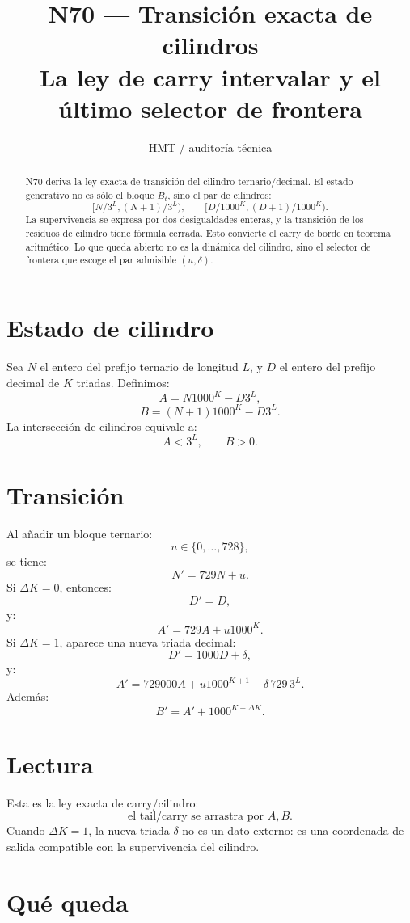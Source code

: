 \documentclass[11pt,a4paper]{article}
\title{\bfseries N70 --- Transición exacta de cilindros\\
\large La ley de carry intervalar y el último selector de frontera}
\author{HMT / auditoría técnica}
\date{}
\begin{document}
\maketitle

\begin{abstract}
N70 deriva la ley exacta de transición del cilindro ternario/decimal. El estado generativo no es sólo el bloque \(B_t\), sino el par de cilindros:
\[
[N/3^L,(N+1)/3^L),
\qquad
[D/1000^K,(D+1)/1000^K).
\]
La supervivencia se expresa por dos desigualdades enteras, y la transición de los residuos de cilindro tiene fórmula cerrada. Esto convierte el carry de borde en teorema aritmético. Lo que queda abierto no es la dinámica del cilindro, sino el selector de frontera que escoge el par admisible \((u,\delta)\).
\end{abstract}

\section{Estado de cilindro}

Sea \(N\) el entero del prefijo ternario de longitud \(L\), y \(D\) el entero del prefijo decimal de \(K\) triadas. Definimos:
\[
A=N1000^K-D3^L,
\]
\[
B=(N+1)1000^K-D3^L.
\]
La intersección de cilindros equivale a:
\[
\boxed{
A<3^L,\qquad B>0.
}
\]

\section{Transición}

Al añadir un bloque ternario:
\[
u\in\{0,\ldots,728\},
\]
se tiene:
\[
N'=729N+u.
\]
Si \(\Delta K=0\), entonces:
\[
D'=D,
\]
y:
\[
\boxed{
A'=729A+u1000^K.
}
\]
Si \(\Delta K=1\), aparece una nueva triada decimal:
\[
D'=1000D+\delta,
\]
y:
\[
\boxed{
A'=729000A+u1000^{K+1}-\delta\,729\,3^L.
}
\]
Además:
\[
\boxed{
B'=A'+1000^{K+\Delta K}.
}
\]

\section{Lectura}

Esta es la ley exacta de carry/cilindro:
\[
\boxed{
\text{el tail/carry se arrastra por }A,B.
}
\]
Cuando \(\Delta K=1\), la nueva triada \(\delta\) no es un dato externo: es una coordenada de salida compatible con la supervivencia del cilindro.

\section{Qué queda}
\end{document}
